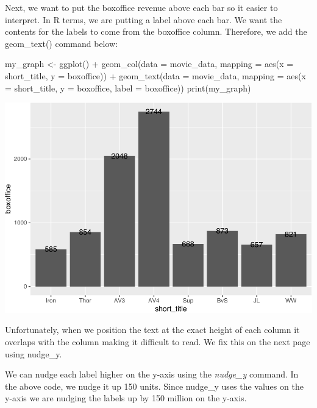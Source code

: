 \documentclass[
]{krantz}
\makeatletter
\newenvironment{Shaded}{\begin{snugshade}}{\end{snugshade}}
\newcommand{\AttributeTok}[1]{\textcolor[rgb]{0.61,0.61,0.61}{#1}}
\newcommand{\FunctionTok}[1]{\textcolor[rgb]{0,0,0}{#1}}
\newcommand{\NormalTok}[1]{#1}
\newcommand{\OtherTok}[1]{\textcolor[rgb]{0.37,0.37,0.37}{#1}}
\newcommand{\SpecialCharTok}[1]{\textcolor[rgb]{0,0,0}{#1}}
\newenvironment{kframe}{%
\medskip{}
\setlength{\fboxsep}{.8em}
 \def\at@end@of@kframe{}%
 \ifinner\ifhmode%
  \def\at@end@of@kframe{\end{minipage}}%
  \begin{minipage}{\columnwidth}%
 \fi\fi%
 \def\FrameCommand##1{\hskip\@totalleftmargin \hskip-\fboxsep
 \colorbox{shadecolor}{##1}\hskip-\fboxsep
     \hskip-\linewidth \hskip-\@totalleftmargin \hskip\columnwidth}%
 \MakeFramed {\advance\hsize-\width
   \@totalleftmargin\z@ \linewidth\hsize
   \@setminipage}}%
 {\par\unskip\endMakeFramed%
 \at@end@of@kframe}
\renewenvironment{Shaded}{\begin{kframe}}{\end{kframe}}
\makeatother
\begin{document}
Next, we want to put the boxoffice revenue above each bar so it easier to interpret. In R terms, we are putting a label above each bar. We want the contents for the labels to come from the boxoffice column. Therefore, we add the geom\_text() command below:

\begin{Shaded}
\begin{Highlighting}[]
\NormalTok{my\_graph }\OtherTok{\textless{}{-}} \FunctionTok{ggplot}\NormalTok{() }\SpecialCharTok{+}
  \FunctionTok{geom\_col}\NormalTok{(}\AttributeTok{data =}\NormalTok{ movie\_data,}
           \AttributeTok{mapping =} \FunctionTok{aes}\NormalTok{(}\AttributeTok{x =}\NormalTok{ short\_title, }
                         \AttributeTok{y =}\NormalTok{ boxoffice)) }\SpecialCharTok{+}
  \FunctionTok{geom\_text}\NormalTok{(}\AttributeTok{data =}\NormalTok{ movie\_data, }
           \AttributeTok{mapping =} \FunctionTok{aes}\NormalTok{(}\AttributeTok{x =}\NormalTok{ short\_title, }
                         \AttributeTok{y =}\NormalTok{ boxoffice, }
                         \AttributeTok{label =}\NormalTok{ boxoffice))}
\FunctionTok{print}\NormalTok{(my\_graph)}
\end{Highlighting}
\end{Shaded}

\includegraphics[width=0.65\linewidth]{bookdown_files/figure-latex/unnamed-chunk-102-1}

Unfortunately, when we position the text at the exact height of each column it overlaps with the column making it difficult to read. We fix this on the next page using nudge\_y.

We can nudge each label higher on the y-axis using the \emph{nudge\_y} command. In the above code, we nudge it up 150 units. Since nudge\_y uses the values on the y-axis we are nudging the labels up by 150 million on the y-axis.
\end{document}
